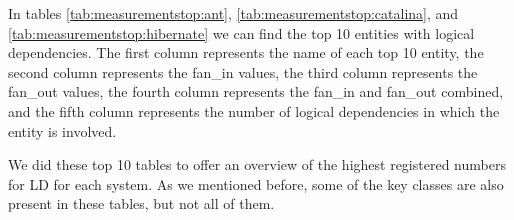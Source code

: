\documentclass[12pt, a4paper, twoside]{report}
\begin{document}
\begin{table}[!h]
\renewcommand{\arraystretch}{1}
\caption{Measurements for Hibernate key classes.}
\label{tab:measurementsfan:hibernate}
\centering
{}
\end{table}



In tables \ref{tab:measurementstop:ant}, \ref{tab:measurementstop:catalina}, and \ref{tab:measurementstop:hibernate} we can find the top 10 entities with logical dependencies. The first column represents the name of each top 10 entity, the second column represents the fan\_in values, the third column represents the fan\_out values, the fourth column represents the fan\_in and fan\_out combined, and the fifth column represents the number of logical dependencies in which the entity is involved.


We did these top 10 tables to offer an overview of the highest registered numbers for LD for each system. As we mentioned before, some of the key classes are also present in these tables, but not all of them.
\end{document}
